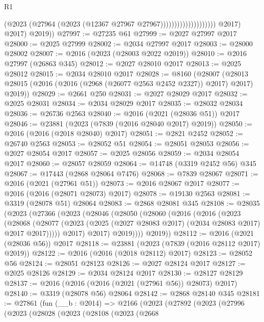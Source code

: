 \begin{lexlean}{R1}
\begin{coremodule}
                                            (@2023
                                              (@27964
                                                (@2023 (@12367 @27967 @27967))))))))))))))))))))
            @2017)
          @2017)
        @2019))
@27997 := @27235 @61
@27999 := @2027 @27997 @2017
@28000 := @2025 @27999
@28002 := @2034 @27997 @2017
@28003 := @28000 @28002
@28007 := @2016 (@2023 (@28003 @2022 @2019))
@28010 := @2016 @27997 (@26863 @345)
@28012 := @2027 @28010 @2017
@28013 := @2025 @28012
@28015 := @2034 @28010 @2017
@28028 := @8160
    (@28007 (@28013 @28015 (@2016 (@2016 (@2968 (@26077 @2563 @2452 @2327)) @2017) @2017) @2019))
@28029 := @2661 @250
@28031 := @2027 @28029 @2017
@28032 := @2025 @28031
@28034 := @2034 @28029 @2017
@28035 := @28032 @28034
@28036 := @26736 @2563
@28040 := @2016 (@2021 (@28036 @51)) @2017
@28046 := @23881 (@2023 (@7839 (@2016 @28040 @2017) @2019))
@28050 := @2016 (@2016 (@2018 @28040) @2017)
@28051 := @2821 @2452
@28052 := @26740 @2563
@28053 := @28052 @51
@28054 := @28051 @28053
@28056 := @2027 @28054 @2017
@28057 := @2025 @28056
@28059 := @2034 @28054 @2017
@28060 := @28057 @28059
@28064 := @14748 (@3319 @2452 @56) @345
@28067 := @17443 (@2868 @28064 @7476)
@28068 := @7839 @28067
@28071 := @2016 (@2021 (@27961 @51))
@28073 := @2016 @28067 @2017
@28077 := @2016 (@2016 (@28071 @28073) @2017)
@28078 := @19130 @2563
@28081 := @3319 (@28078 @51) @28064
@28083 := @2868 @28081 @345
@28108 := @28035
    (@2023
      (@27366
        (@2023
          (@28046
            (@28050
              (@28060
                (@2016
                  (@2016
                    (@2023
                      (@28068
                        (@28077
                          (@2023 (@2025 (@2027 @28083 @2017) (@2034 @28083 @2017) @2017 @2017)))))
                    @2017)
                  @2017)
                @2019))))
        @2019))
@28112 := @2016 (@2021 (@28036 @56)) @2017
@28118 := @23881 (@2023 (@7839 (@2016 @28112 @2017) @2019))
@28122 := @2016 (@2016 (@2018 @28112) @2017)
@28123 := @28052 @56
@28124 := @28051 @28123
@28126 := @2027 @28124 @2017
@28127 := @2025 @28126
@28129 := @2034 @28124 @2017
@28130 := @28127 @28129
@28137 := @2016 (@2016 (@2016 (@2021 (@27961 @56)) @28073) @2017)
@28140 := @3319 (@28078 @56) @28064
@28142 := @2868 @28140 @345
@28181 := @27861
    (fun (__b : @2014) =>
    @2166
      (@2023
        (@27892
          (@2023
            (@27996
              (@2023
                (@28028
                  (@2023
                    (@28108
                      (@2023
                        (@2668

\end{coremodule}
\end{lexlean}
